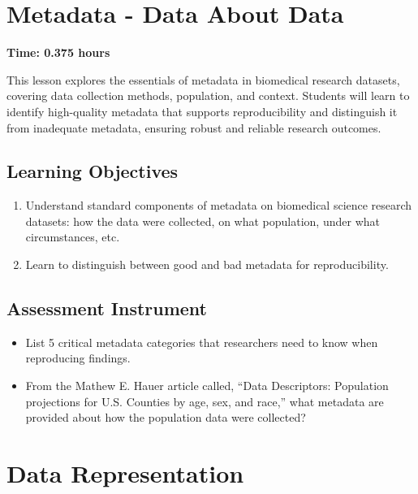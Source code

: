 \section{Metadata - Data About Data}
\label{sec:2.2}

\textbf{Time: 0.375 hours}

This lesson explores the essentials of metadata in biomedical research datasets, covering data collection methods, population, and context. Students will learn to identify high-quality metadata that supports reproducibility and distinguish it from inadequate metadata, ensuring robust and reliable research outcomes.

\subsection{Learning Objectives}

\begin{enumerate}
    \item Understand standard components of metadata on biomedical science research datasets: how the data were collected, on what population, under what circumstances, etc.
    \item Learn to distinguish between good and bad metadata for reproducibility.
\end{enumerate}

\subsection{Assessment Instrument}

\begin{itemize}
    \item List 5 critical metadata categories that researchers need to know when reproducing findings.
    \item From the Mathew E. Hauer article called, ``Data Descriptors: Population projections for U.S. Counties by age, sex, and race,'' what metadata are provided about how the population data were collected?
\end{itemize}


\section{Data Representation}
\label{sec:2.3}

